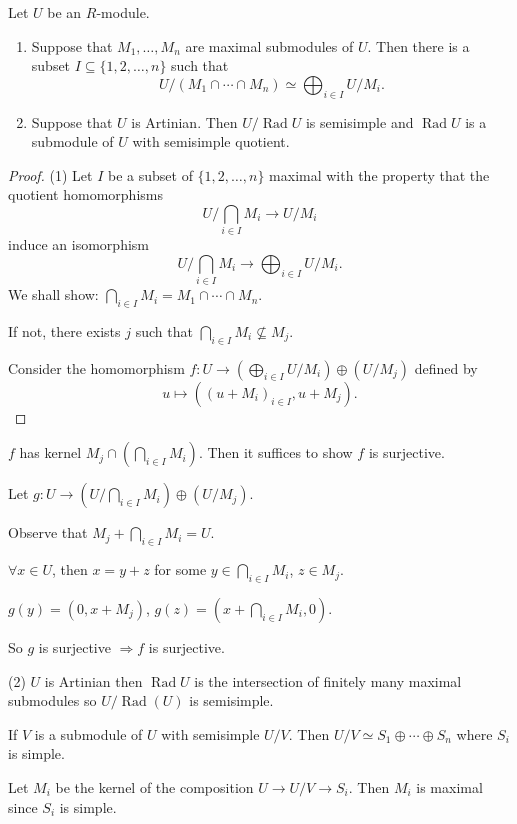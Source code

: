 \documentclass[11pt, a4paper]{report}
\begin{document}
\begin{lemma}
Let $U$ be an $R$-module.
\begin{enumerate}
\item Suppose that $M_{1}, \ldots, M_{n}$ are maximal submodules of $U$. Then there is a subset $I \subseteq \{1,2,\ldots, n\}$ such that
\[
U/(M_{1} \cap \cdots \cap M_{n}) \simeq \bigoplus_{i \in I} U/M_{i}.
\]
\item Suppose that $U$ is Artinian. Then $U/\operatorname{Rad} U$ is semisimple and $\operatorname{Rad} U$ is a submodule of $U$ with semisimple quotient.
\end{enumerate}
\end{lemma}

\begin{proof}
(1) Let $I$ be a subset of $\{1,2,\ldots, n\}$ maximal with the property that the quotient homomorphisms
\[
U/\bigcap_{i \in I} M_{i} \to U/M_{i}
\]
induce an isomorphism
\[
U/\bigcap_{i \in I} M_{i} \to \bigoplus_{i \in I} U/M_{i}.
\]
We shall show: $\bigcap_{i \in I} M_{i}=M_{1} \cap \cdots \cap M_{n}$.

If not, there exists $j$ such that $\bigcap_{i \in I} M_{i} \not\subseteq M_{j}$.

Consider the homomorphism $f\colon U \to \left(\bigoplus_{i \in I} U/M_{i}\right) \oplus \left(U/M_{j}\right)$ defined by
\[
u \mapsto \left((u+M_{i})_{i \in I}, u+M_{j}\right).
\]
\end{proof}
$f$ has kernel $M_{j} \cap \left(\bigcap_{i \in I} M_{i}\right)$. Then it suffices to show $f$ is surjective.

Let $g: U \rightarrow \left(U / \bigcap_{i \in I} M_{i}\right) \oplus \left(U / M_{j}\right)$.

Observe that $M_{j} + \bigcap_{i \in I} M_{i} = U$.

$\forall x \in U$, then $x = y + z$ for some $y \in \bigcap_{i \in I} M_{i}$, $z \in M_{j}$.

$g(y) = \left(0, x + M_{j}\right)$, \quad $g(z) = \left(x + \bigcap_{i \in I} M_{i}, 0\right)$.

So $g$ is surjective $\Rightarrow f$ is surjective.

(2) $U$ is Artinian then $\operatorname{Rad} U$ is the intersection of finitely many maximal submodules so $U / \operatorname{Rad}(U)$ is semisimple.

If $V$ is a submodule of $U$ with semisimple $U/V$. Then $U/V \simeq S_{1} \oplus \cdots \oplus S_{n}$ where $S_{i}$ is simple.

Let $M_{i}$ be the kernel of the composition $U \rightarrow U/V \rightarrow S_{i}$. Then $M_{i}$ is maximal since $S_{i}$ is simple.
\end{document}
